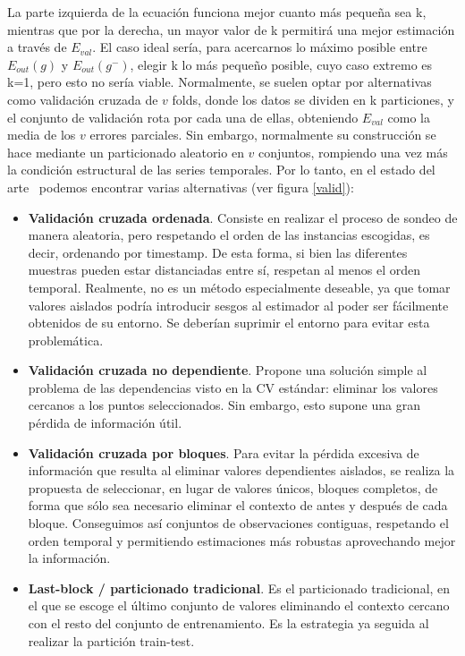 La parte izquierda de la ecuación funciona mejor cuanto más pequeña sea k, mientras que por la derecha, un mayor valor de k permitirá una mejor estimación a través de $E_{val}$. El caso ideal sería, para acercarnos lo máximo posible entre $E_{out}(g)$ y $ E_{out}(g^-)$, elegir k lo más pequeño posible, cuyo caso extremo es k=1, pero esto no sería viable. Normalmente, se suelen optar por alternativas como validación cruzada de $v$ folds, donde los datos se dividen en k particiones, y el conjunto de validación rota por cada una de ellas, obteniendo $E_{val}$ como la media de los $v$ errores parciales. Sin embargo, normalmente su construcción se hace mediante un particionado aleatorio en $v$ conjuntos, rompiendo una vez más la condición estructural de las series temporales. Por lo tanto, en el estado del arte~\cite{bergmeir2012use} podemos encontrar varias alternativas (ver figura \ref{valid}):

\begin{itemize}
	\item \textbf{Validación cruzada ordenada}. Consiste en realizar el proceso de sondeo de manera aleatoria, pero respetando el orden de las instancias escogidas, es decir, ordenando por timestamp. De esta forma, si bien las diferentes muestras pueden estar distanciadas entre sí, respetan al menos el orden temporal. Realmente, no es un método especialmente deseable, ya que tomar valores aislados podría introducir sesgos al estimador al poder ser fácilmente obtenidos de su entorno. Se deberían suprimir el entorno para evitar esta problemática.
	\item \textbf{Validación cruzada no dependiente}. Propone una solución simple al problema de las dependencias visto en la CV estándar: eliminar los valores cercanos a los puntos seleccionados. Sin embargo, esto supone una gran pérdida de información útil.
	\item \textbf{Validación cruzada por bloques}. Para evitar la pérdida excesiva de información que resulta al eliminar valores dependientes aislados, se realiza la propuesta de seleccionar, en lugar de valores únicos, bloques completos, de forma que sólo sea necesario eliminar el contexto de antes y después de cada bloque. Conseguimos así conjuntos de observaciones contiguas, respetando el orden temporal y permitiendo estimaciones más robustas aprovechando mejor la información.
	\item \textbf{Last-block / particionado tradicional}. Es el particionado tradicional, en el que se escoge el último conjunto de valores eliminando el contexto cercano con el resto del conjunto de entrenamiento. Es la estrategia ya seguida al realizar la partición train-test.
\end{itemize}

